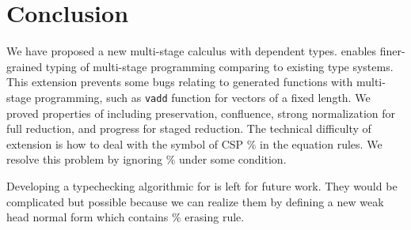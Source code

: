 
\section{Conclusion \label{sec:conclusion}}

We have proposed a new multi-stage calculus \LMD with dependent types.
\LMD enables finer-grained typing of multi-stage programming comparing to existing type systems.
This extension prevents some bugs relating to generated functions with multi-stage programming,
such as \verb|vadd| function for vectors of a fixed length.
We proved properties of \LMD including preservation, confluence, 
strong normalization for full reduction, and progress for staged reduction.
The technical difficulty of extension is how to deal with the symbol of CSP $\%$ in the equation rules.
We resolve this problem by ignoring $\%$ under some condition.

Developing a typechecking algorithmic for \LMD is left for future work.
They would be complicated but possible 
because we can realize them by defining a new weak head normal form which contains $\%$ erasing rule.